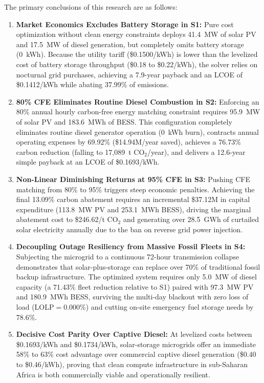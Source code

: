 \documentclass[11pt,a4paper]{article}
\begin{document}
The primary conclusions of this research are as follows:
\begin{enumerate}
    \item \textbf{Market Economics Excludes Battery Storage in S1:} Pure cost optimization without clean energy constraints deploys 41.4~MW of solar PV and 17.5~MW of diesel generation, but completely omits battery storage (0~kWh). Because the utility tariff (\$0.1500/kWh) is lower than the levelized cost of battery storage throughput (\$0.18 to \$0.22/kWh), the solver relies on nocturnal grid purchases, achieving a 7.9-year payback and an LCOE of \$0.1412/kWh while abating 37.99\% of emissions.
    \item \textbf{80\% CFE Eliminates Routine Diesel Combustion in S2:} Enforcing an 80\% annual hourly carbon-free energy matching constraint requires 95.9~MW of solar PV and 183.6~MWh of BESS. This configuration completely eliminates routine diesel generator operation (0~kWh burn), contracts annual operating expenses by 69.92\% (\$14.94M/year saved), achieves a 76.73\% carbon reduction (falling to 17,089~t CO$_2$/year), and delivers a 12.6-year simple payback at an LCOE of \$0.1693/kWh.
    \item \textbf{Non-Linear Diminishing Returns at 95\% CFE in S3:} Pushing CFE matching from 80\% to 95\% triggers steep economic penalties. Achieving the final 13.09\% carbon abatement requires an incremental \$37.12M in capital expenditure (113.8~MW PV and 253.1~MWh BESS), driving the marginal abatement cost to \$246.62/t CO$_2$ and generating over 28.5~GWh of curtailed solar electricity annually due to the ban on reverse grid power injection.
    \item \textbf{Decoupling Outage Resiliency from Massive Fossil Fleets in S4:} Subjecting the microgrid to a continuous 72-hour transmission collapse demonstrates that solar-plus-storage can replace over 70\% of traditional fossil backup infrastructure. The optimized system requires only 5.0~MW of diesel capacity (a 71.43\% fleet reduction relative to S1) paired with 97.3~MW PV and 180.9~MWh BESS, surviving the multi-day blackout with zero loss of load ($\text{LOLP}=0.000\%$) and cutting on-site emergency fuel storage needs by 78.6\%.
    \item \textbf{Decisive Cost Parity Over Captive Diesel:} At levelized costs between \$0.1693/kWh and \$0.1734/kWh, solar-storage microgrids offer an immediate 58\% to 63\% cost advantage over commercial captive diesel generation (\$0.40 to \$0.46/kWh), proving that clean compute infrastructure in sub-Saharan Africa is both commercially viable and operationally resilient.
\end{enumerate}
\end{document}
